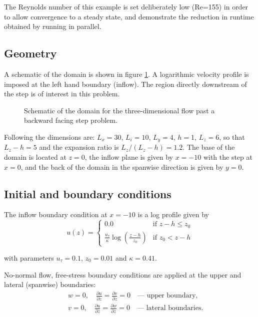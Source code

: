 The Reynolds number of this example is set deliberately low (Re=155) in order to
allow convergence to a steady state, and demonstrate the reduction in runtime obtained
by running in parallel.

\subsection{Geometry}
A schematic of the domain is shown in figure \ref{Fig:Schematic3d}.
A logarithmic velocity profile is imposed at the left hand boundary (inflow).
The region directly downstream of the step is of interest in this problem.

\begin{figure}
\centering
{}
\caption{Schematic of the domain for the three-dimensional flow past a backward facing step
problem.}
\label{Fig:Schematic3d}
\end{figure}

Following \cite{le1997} the dimensions are: $L_x=30$, $L_i=10$, $L_y=4$, $h=1$, $L_z=6$,
so that $L_z-h=5$ and the expansion ratio is $L_z/(L_z-h)=1.2$.
The base of the domain is located at $z=0$, the inflow plane is given by $x=-10$ with the step
at $x=0$, and the back of the domain in the spanwise direction is given by $y=0$.

\subsection{Initial and boundary conditions}
The inflow boundary condition at $x=-10$ is a log profile given by
\begin{equation*}
u(z) =
  \begin{cases}
    0.0 & \text{if } z-h \leq z_0 \\
    \frac{u_{\tau}}{\kappa} \log \left(\frac{z - h}{z_0}\right) & \text{if } z_0 < z-h
  \end{cases}
\end{equation*}

with parameters $u_{\tau} = 0.1$, $z_0 = 0.01$ and $\kappa = 0.41$.

No-normal flow, free-stress boundary conditions are applied at the upper and lateral
(spanwise) boundaries:
\begin{eqnarray*}
&&w=0,\quad \frac{\partial u}{\partial z} = \frac{\partial v}{\partial z} = 0 \quad\textrm{--- upper boundary},\\
&&v=0,\quad \frac{\partial u}{\partial z} = \frac{\partial w}{\partial z} = 0 \quad\textrm{--- lateral boundaries}.
\end{eqnarray*}

